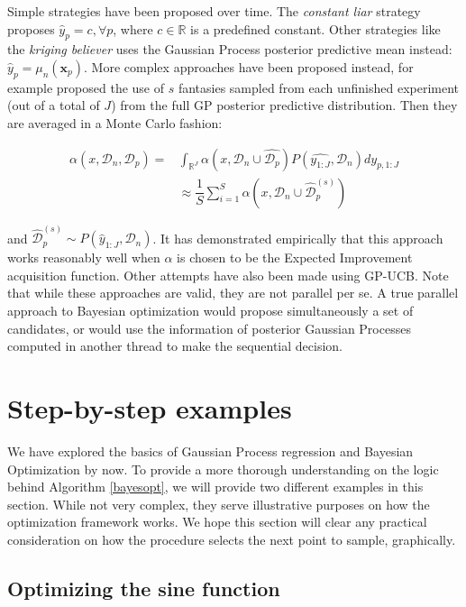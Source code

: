 \documentclass[10pt,a4paper,twoside]{book}
\begin{document}
Simple strategies have been proposed over time. The \textit{constant liar} strategy proposes $\hat{y}_p = c, \forall p$, where $c \in \mathbb{R}$ is a predefined constant. Other strategies like the \textit{kriging believer} uses the Gaussian Process posterior predictive mean instead: $\hat{y}_p = \mu_n(\boldsymbol{x}_p)$. More complex approaches have been proposed instead, for example \cite{Snoek2012} proposed the use of $s$ fantasies sampled from each unfinished experiment (out of a total of $J$) from the full GP posterior predictive distribution. Then they are averaged in a Monte Carlo fashion:

\begin{align}
\alpha(x, \mathcal{D}_n, \mathcal{D}_p) =& \int_{\mathbb{R}^J} \alpha(x, \mathcal{D}_n \cup \hat{\mathcal{D}_p})P(\hat{y_{1:J}}, \mathcal{D}_n) dy_{p, 1:J}\\
&\approx \dfrac{1}{S} \sum_{i=1}^S \alpha(x, \mathcal{D}_n \cup \hat{\mathcal{D}}_p^{(s)})
\end{align} 

and $\hat{\mathcal{D}}_p^{(s)} \sim P(\hat{y}_{1:J}, \mathcal{D}_n)$. It has demonstrated empirically that this approach works reasonably well when $\alpha$ is chosen to be the Expected Improvement acquisition function. Other attempts \cite{Desautels2012} have also been made using GP-UCB. Note that while these approaches are valid, they are not parallel per se. A true parallel approach to Bayesian optimization would propose simultaneously a set of candidates, or would use the information of posterior Gaussian Processes computed in another thread to make the sequential decision. 


\section{Step-by-step examples}

We have explored the basics of Gaussian Process regression and Bayesian Optimization by now. To provide a more thorough understanding on the logic behind Algorithm \ref{bayesopt}, we will provide two different examples in this section. While not very complex, they serve illustrative purposes on how the optimization framework works. We hope this section will clear any practical consideration on how the procedure selects the next point to sample, graphically.

\subsection{Optimizing the sine function}
\end{document}
